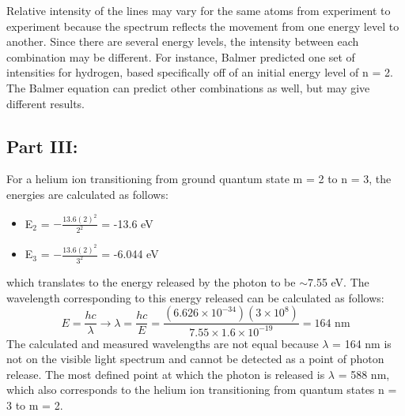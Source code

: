 \documentclass[10pt, letterpaper, twoside]{article}
\begin{document}
Relative intensity of the lines may vary for the same atoms from experiment to experiment because the spectrum reflects the movement from one energy level to another. Since there are several energy levels, the intensity between each combination may be different. For instance, Balmer predicted one set of intensities for hydrogen, based specifically off of an initial energy level of n = 2. The Balmer equation can predict other combinations as well, but may give different results. 
\vspace{-2.5em}

\subsection{Part III:}
\vspace{-1em}
For a helium ion transitioning from ground quantum state m = 2 to n = 3, the energies are calculated as follows:
\vspace{-1em}
\begin{itemize}
    \item E$_2$ = $-\frac{13.6(2)^2}{2^2}$ = -13.6 eV
\end{itemize}\vspace{-2em}

\begin{itemize}
    \item E$_3$ = $-\frac{13.6(2)^2}{3^2}$ = -6.044 eV
\end{itemize}\vspace{-2em}
which translates to the energy released by the photon to be $\sim$7.55 eV. The wavelength corresponding to this energy released can be calculated as follows:
\vspace{-1em}
\begin{equation*}
E = \frac{hc}{\lambda} \rightarrow \lambda = \frac{hc}{E} = \frac{(6.626\times10^{-34})(3\times10^8)}{7.55\times1.6\times10^{-19}} = 164 \text{ nm}
\end{equation*}
The calculated and measured wavelengths are not equal because $\lambda$ = 164 nm is not on the visible light spectrum and cannot be detected as a point of photon release. The most defined point at which the photon is released is $\lambda$ = 588 nm, which also corresponds to the helium ion transitioning from quantum states n = 3 to m = 2.
\end{document}
